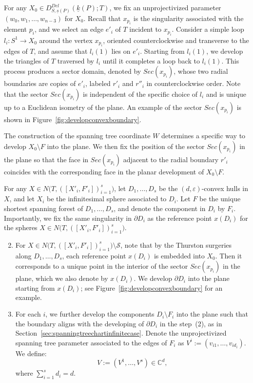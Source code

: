 \documentclass{compositio}
\numberwithin{equation}{section}
\numberwithin{figure}{section}
\theoremstyle{definition}
\theoremstyle{plain}
\begin{document}
{For any $X_0 \in D_{S,\underline{s}(P)}^{Del}(\underline{k}(P);T)$, we fix an unprojectivized parameter $(w_0,w_1,\ldots,w_{n-3})$ for $X_0$. Recall that $x_{p_i}$ is the singularity associated with the element $p_i$, and we select an edge $e'_i$ of $T$ incident to $x_{p_i}$. Consider a simple loop $l_i: S^1 \to X_0$ around the vertex $x_{p_i}$, oriented counterclockwise and transverse to the edges of $T$, and assume that $l_i(1)$ lies on $e'_i$. Starting from $l_i(1)$, we develop the triangles of $T$ traversed by $l_i$ until it completes a loop back to $l_i(1)$. This process produces a sector domain, denoted by $Sec(x_{p_i})$, whose two radial boundaries are copies of $e'_i$, labeled $r'_i$ and $r''_i$ in counterclockwise order. Note that the sector $Sec(x_{p_i})$ is independent of the specific choice of $l_i$ and is unique up to a Euclidean isometry of the plane. An example of the sector $Sec(x_{p_i})$ is shown in Figure~\ref{fig:developconvexboundary}.

The construction of the spanning tree coordinate $W$ determines a specific way to develop $X_0 \setminus F$ into the plane. We then fix the position of the sector $Sec(x_{p_i})$ in the plane so that the face in $Sec(x_{p_i})$ adjacent to the radial boundary $r'_i$ coincides with the corresponding face in the planar development of $X_0 \setminus F$.

For any $X \in N\big(T, ([X'_i, F'_i])_{i=1}^s\big)$, let $D_1, \ldots, D_s$ be the $(d, \varepsilon)$-convex hulls in $X$, and let $X_i$ be the infinitesimal sphere associated to $D_i$. Let $F$ be the unique shortest spanning forest of $D_1, \ldots, D_s$, and denote the component in $D_i$ by $F_i$. Importantly, we fix the same singularity in $\partial D_i$ as the reference point $x(D_i)$ for the spheres $X\in N\big(T, ([X'_i, F'_i])_{i=1}^s\big)$. 

\begin{enumerate}  
    \setcounter{enumi}{1}
    \item For $X \in N\big(T, ([X'_i, F'_i])_{i=1}^s\big) \setminus \mathcal{S}$, note that by the Thurston surgeries along $D_1,\ldots,D_s$, each reference point $x(D_i)$ is embedded into $X_0$. Then it corresponds to a unique point in the interior of the sector $Sec(x_{p_i})$ in the plane, which we also denote by $x(D_i)$.  We develop $\partial D_i$ into the plane starting from $x(D_i)$; see Figure~\ref{fig:developconvexboundary} for an example.

    \item For each $i$, we further develop the components $D_i\setminus F_i$ into the plane such that the boundary aligns with the developing of $\partial D_i$ in the step~(2), as in Section~\ref{sec:spanningtreechartinfinitecase}. Denote the unprojectivized spanning tree parameter associated to the edges of $F_i$ as $V^i := (v_{i1}, \ldots, v_{id_i})$. We define:
    \begin{equation}\label{equ:defofVparameter}
        V := (V^1, \ldots, V^s) \in \mathbb{C}^d,
    \end{equation}
    where $\sum_{i=1}^s d_i = d$.
\end{enumerate}

}
\end{document}
